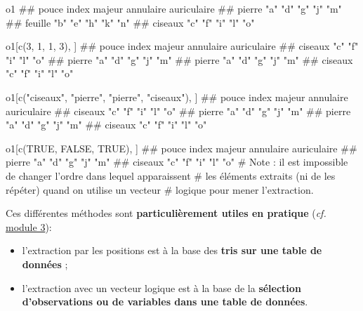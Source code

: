 \documentclass[12pt,twosided, notitlepage]{book}
\newenvironment{Shaded}{}{}
\newcommand{\KeywordTok}[1]{\textcolor[rgb]{0.00,0.00,1.00}{#1}}
\newcommand{\DecValTok}[1]{#1}
\newcommand{\StringTok}[1]{\textcolor[rgb]{0.00,0.50,0.50}{#1}}
\newcommand{\CommentTok}[1]{\textcolor[rgb]{0.00,0.50,0.00}{#1}}
\newcommand{\OtherTok}[1]{\textcolor[rgb]{1.00,0.25,0.00}{#1}}
\newcommand{\NormalTok}[1]{#1}
\providecommand{\tightlist}{%
  \setlength{\itemsep}{0pt}\setlength{\parskip}{0pt}}
\renewenvironment{Shaded}{\begin{snugshade}}{\end{snugshade}}
\begin{document}
\begin{Shaded}
\begin{Highlighting}[]
\NormalTok{o1}
\NormalTok{  ##         pouce index majeur annulaire auriculaire}
\NormalTok{  ## pierre  "a"   "d"   "g"    "j"       "m"        }
\NormalTok{  ## feuille "b"   "e"   "h"    "k"       "n"        }
\NormalTok{  ## ciseaux "c"   "f"   "i"    "l"       "o"}

\NormalTok{o1[}\KeywordTok{c}\NormalTok{(}\DecValTok{3}\NormalTok{, }\DecValTok{1}\NormalTok{, }\DecValTok{1}\NormalTok{, }\DecValTok{3}\NormalTok{), ]}
\NormalTok{  ##         pouce index majeur annulaire auriculaire}
\NormalTok{  ## ciseaux "c"   "f"   "i"    "l"       "o"        }
\NormalTok{  ## pierre  "a"   "d"   "g"    "j"       "m"        }
\NormalTok{  ## pierre  "a"   "d"   "g"    "j"       "m"        }
\NormalTok{  ## ciseaux "c"   "f"   "i"    "l"       "o"}


\NormalTok{o1[}\KeywordTok{c}\NormalTok{(}\StringTok{"ciseaux"}\NormalTok{, }\StringTok{"pierre"}\NormalTok{, }\StringTok{"pierre"}\NormalTok{, }\StringTok{"ciseaux"}\NormalTok{), ]}
\NormalTok{  ##         pouce index majeur annulaire auriculaire}
\NormalTok{  ## ciseaux "c"   "f"   "i"    "l"       "o"        }
\NormalTok{  ## pierre  "a"   "d"   "g"    "j"       "m"        }
\NormalTok{  ## pierre  "a"   "d"   "g"    "j"       "m"        }
\NormalTok{  ## ciseaux "c"   "f"   "i"    "l"       "o"}

\NormalTok{o1[}\KeywordTok{c}\NormalTok{(}\OtherTok{TRUE}\NormalTok{, }\OtherTok{FALSE}\NormalTok{, }\OtherTok{TRUE}\NormalTok{), ]}
\NormalTok{  ##         pouce index majeur annulaire auriculaire}
\NormalTok{  ## pierre  "a"   "d"   "g"    "j"       "m"        }
\NormalTok{  ## ciseaux "c"   "f"   "i"    "l"       "o"}
\CommentTok{# Note : il est impossible de changer l'ordre dans lequel apparaissent}
\CommentTok{# les éléments extraits (ni de les répéter) quand on utilise un vecteur}
\CommentTok{# logique pour mener l'extraction.}
\end{Highlighting}
\end{Shaded}

Ces différentes méthodes sont \textbf{particulièrement utiles en
pratique} (\emph{cf.} \underline{module 3}):

\begin{itemize}
\tightlist
\item
  l'extraction par les positions est à la base des \textbf{tris sur une
  table de données} ;
\item
  l'extraction avec un vecteur logique est à la base de la
  \textbf{sélection d'observations ou de variables dans une table de
  données}.
\end{itemize}
\end{document}
